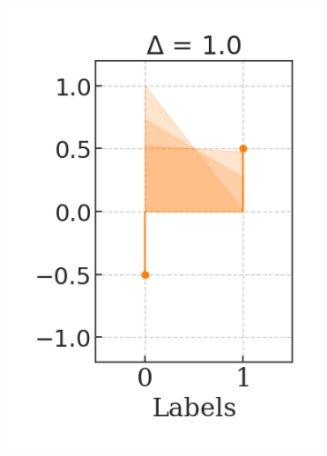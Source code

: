 \begin{figure}[H]
\begin{subfigure}[b]{0.2\textwidth}
        \includegraphics[width=\textwidth]{img/results_discussion/empirical/ldiff=1.0.png}
    \end{subfigure}
    \hfill
    \begin{subfigure}[b]{0.2\textwidth}
        \centering

\end{subfigure}
\end{figure}
